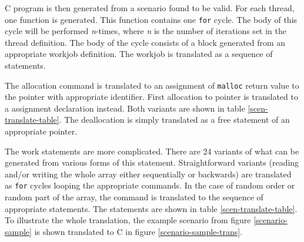 C program is then generated from a scenario found to be valid. For each thread,
one function is generated. This function contains one {\tt for} cycle. The body
of this cycle will be performed {\em n}-times, where {\em n} is the number of
iterations set in the thread definition. The body of the cycle consists of a
block generated from an appropriate workjob definition. The workjob is
translated as a sequence of statements.

The allocation command is translated to an assignment of {\tt malloc} return
value to the pointer with appropriate identifier. First allocation to pointer is
translated to a assignment declaration instead. Both variants are shown in table
\ref{scen-translate-table}. The deallocation is simply translated as a free
statement of an appropriate pointer.

The work statements are more complicated. There are 24 variants of what can be
generated from various forms of this statement. Straightforward variants
(reading and/or writing the whole array either sequentially or backwards) are
translated as {\tt for} cycles looping the appropriate commands. In the case of
random order or random part of the array, the command is translated to the
sequence of appropriate statements. The statements are shown in table
\ref{scen-translate-table}. To illustrate the whole translation, the example
scenario from figure \ref{scenario-sample} is shown translated to C in figure
\ref{scenario-sample-trans}.

